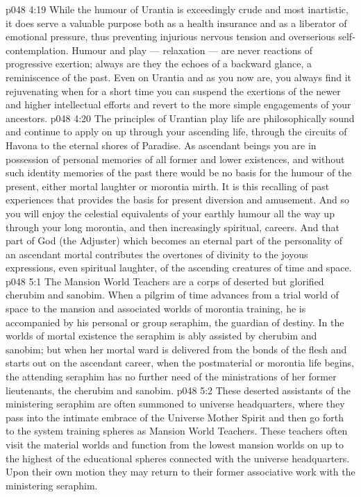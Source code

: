 \vs p048 4:19 \pc While the humour of Urantia is exceedingly crude and most inartistic, it does serve a valuable purpose both as a health insurance and as a liberator of emotional pressure, thus preventing injurious nervous tension and overserious self\hyp{}contemplation. Humour and play --- relaxation --- are never reactions of progressive exertion; always are they the echoes of a backward glance, a reminiscence of the past. Even on Urantia and as you now are, you always find it rejuvenating when for a short time you can suspend the exertions of the newer and higher intellectual efforts and revert to the more simple engagements of your ancestors.
\vs p048 4:20 The principles of Urantian play life are philosophically sound and continue to apply on up through your ascending life, through the circuits of Havona to the eternal shores of Paradise. As ascendant beings you are in possession of personal memories of all former and lower existences, and without such identity memories of the past there would be no basis for the humour of the present, either mortal laughter or morontia mirth. It is this recalling of past experiences that provides the basis for present diversion and amusement. And so you will enjoy the celestial equivalents of your earthly humour all the way up through your long morontia, and then increasingly spiritual, careers. And that part of God (the Adjuster) which becomes an eternal part of the personality of an ascendant mortal contributes the overtones of divinity to the joyous expressions, even spiritual laughter, of the ascending creatures of time and space.
\vs p048 5:1 The Mansion World Teachers are a corps of deserted but glorified cherubim and sanobim. When a pilgrim of time advances from a trial world of space to the mansion and associated worlds of morontia training, he is accompanied by his personal or group seraphim, the guardian of destiny. In the worlds of mortal existence the seraphim is ably assisted by cherubim and sanobim; but when her mortal ward is delivered from the bonds of the flesh and starts out on the ascendant career, when the postmaterial or morontia life begins, the attending seraphim has no further need of the ministrations of her former lieutenants, the cherubim and sanobim.
\vs p048 5:2 These deserted assistants of the ministering seraphim are often summoned to universe headquarters, where they pass into the intimate embrace of the Universe Mother Spirit and then go forth to the system training spheres as Mansion World Teachers. These teachers often visit the material worlds and function from the lowest mansion worlds on up to the highest of the educational spheres connected with the universe headquarters. Upon their own motion they may return to their former associative work with the ministering seraphim.
